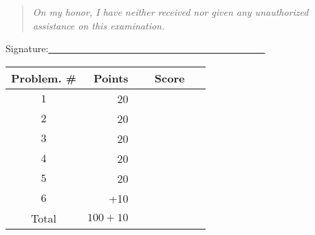 \documentclass{article}
\theoremstyle{definition}
\begin{document}
\begin{quote}
\emph{On my honor, I have neither received nor given any unauthorized assistance on this
examination.} 
\end{quote}
\hfill{Signature:\underline{~~~~~~~~~~~~~~~~~~~~~~~~~~~~~~~~~~~~~~~~~~~~~}}

\bigskip

\begin{center}
\begin{tabular}{|c|r|c|}
\hline
Problem. \# & Points & Score \\ \hline\hline
$1$ & 20 & ~~~~~~~~~~~\\  \hline
$2$ & 20 & \\ \hline
$3$ & 20 & \\ \hline
$4$ & 20 & \\ \hline
$5$ & 20 & \\ \hline
$6$ & +10 & \\ \hline
Total & $100 + 10$ & \\ \hline
\end{tabular}
\end{center}

\newpage
\end{document}

